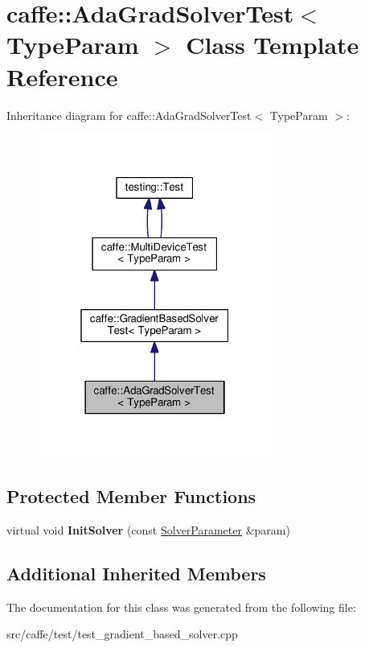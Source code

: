 \hypertarget{classcaffe_1_1_ada_grad_solver_test}{}\section{caffe\+:\+:Ada\+Grad\+Solver\+Test$<$ Type\+Param $>$ Class Template Reference}
\label{classcaffe_1_1_ada_grad_solver_test}


Inheritance diagram for caffe\+:\+:Ada\+Grad\+Solver\+Test$<$ Type\+Param $>$\+:
\nopagebreak
\begin{figure}[H]
\begin{center}
\leavevmode
\includegraphics[width=217pt]{classcaffe_1_1_ada_grad_solver_test__inherit__graph}
\end{center}
\end{figure}
\subsection*{Protected Member Functions}
\begin{DoxyCompactItemize}
\item 
\mbox{\label{classcaffe_1_1_ada_grad_solver_test_a81940a2a2240e7aaf567851a5c005c69}} 
virtual void {\bfseries Init\+Solver} (const \mbox{\hyperlink{classcaffe_1_1_solver_parameter}{Solver\+Parameter}} \&param)
\end{DoxyCompactItemize}
\subsection*{Additional Inherited Members}


The documentation for this class was generated from the following file\+:\begin{DoxyCompactItemize}
\item 
src/caffe/test/test\+\_\+gradient\+\_\+based\+\_\+solver.\+cpp\end{DoxyCompactItemize}
